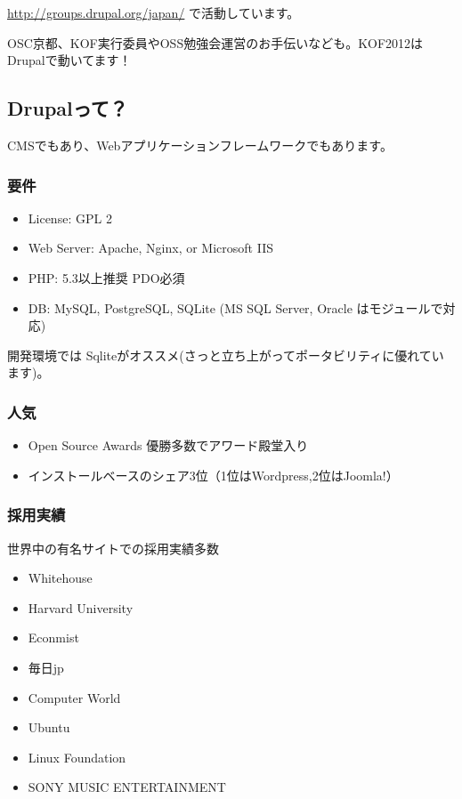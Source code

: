 \documentclass[mingoth,a4paper]{jsarticle}
\begin{document}
\url{http://groups.drupal.org/japan/} で活動しています。

OSC京都、KOF実行委員やOSS勉強会運営のお手伝いなども。KOF2012はDrupalで動いてます！

\clearpage

\subsection{Drupalって？}
CMSでもあり、Webアプリケーションフレームワークでもあります。

\subsubsection{要件}
\begin{itemize}
\item License: GPL 2
\item Web Server: Apache, Nginx, or Microsoft IIS
\item PHP: 5.3以上推奨  PDO必須
\item DB: MySQL, PostgreSQL, SQLite
  (MS SQL Server, Oracle はモジュールで対応)

\cite{requirements}
\end{itemize}

開発環境では Sqliteがオススメ(さっと立ち上がってポータビリティに優れています)。

\subsubsection{人気}

\begin{itemize}
\item Open Source Awards 優勝多数でアワード殿堂入り
\item インストールベースのシェア3位（1位はWordpress,2位はJoomla!）
\end{itemize}

\subsubsection{採用実績}
世界中の有名サイトでの採用実績多数
\begin{itemize}
\item Whitehouse
\item Harvard University
\item Econmist
\item 毎日jp
\item Computer World
\item Ubuntu
\item Linux Foundation
\item SONY MUSIC ENTERTAINMENT
\end{itemize}
\end{document}
